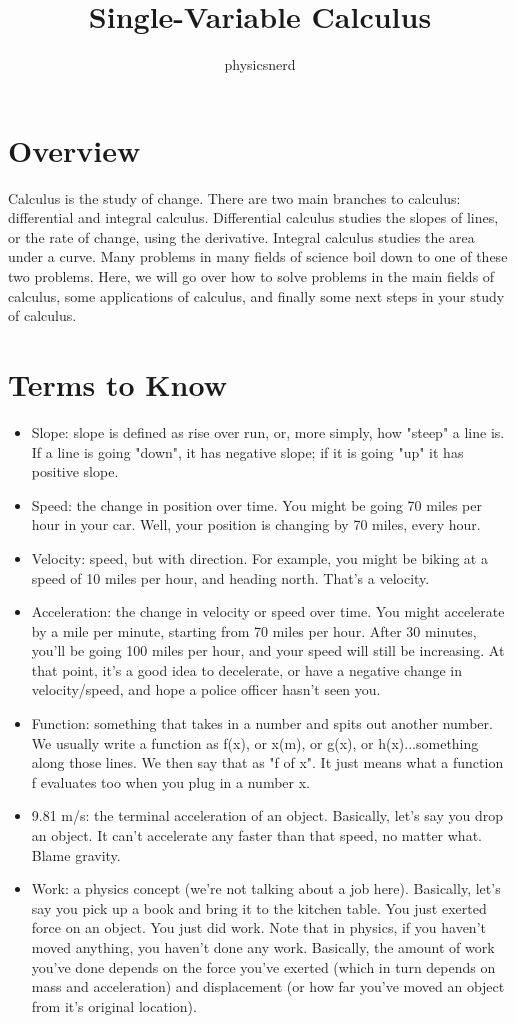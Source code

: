 \documentclass[12pt]{article}
\title{Single-Variable Calculus}
\author{physicsnerd}
\begin{document}
\maketitle
\tableofcontents

\section{Overview}
Calculus is the study of change. There are two main branches to
calculus: differential and integral calculus. Differential calculus
studies the slopes of lines, or the rate of change, using the
derivative. Integral calculus studies the area under a curve. Many
problems in many fields of science  boil down to one of these two
problems. Here, we will go over how to solve problems in the main
fields of calculus, some applications of calculus, and finally some
next steps in your study of calculus.

\section{Terms to Know}

\begin{itemize}
\item Slope: slope is defined as rise over run, or, more simply, how
"steep" a line is. If a line is going "down", it has negative slope;
if it is going "up" it has positive slope.
\item Speed: the change in position over time. You might be going 70
miles per hour in your car. Well, your  position is changing by 70
miles, every hour.
\item Velocity: speed, but with direction. For example, you might be
biking at a speed of 10 miles per hour, and heading north. That's a
velocity.
\item Acceleration: the change in velocity or speed over time. You
might accelerate by a mile per minute, starting from 70 miles per
hour. After 30 minutes, you'll be going 100 miles per hour, and your
speed will still be increasing. At that point, it's a good idea to
decelerate, or have a negative change in velocity/speed, and hope a
police officer hasn't seen you.
\item Function: something that takes in a number and spits out another
number. We usually write a function as f(x), or x(m), or g(x), or
h(x)...something along those lines. We then say that as "f of x". It
just means what a function f evaluates too when you plug in a number
x.
\item 9.81 m/s: the terminal acceleration of an object. Basically,
let's say you drop an object. It can't accelerate any faster than that
speed, no matter what. Blame gravity.
\item Work: a physics concept (we're not talking about a job here).
Basically, let's say you pick up a book and bring it to the kitchen
table. You just exerted force on an object. You just did work. Note
that in physics, if you haven't moved anything, you haven't done any
work. Basically, the amount of work you've done depends on the force
you've exerted (which in turn depends on mass and acceleration) and
displacement (or how far you've moved an object from it's original
location).
\end{itemize}
\end{document}
